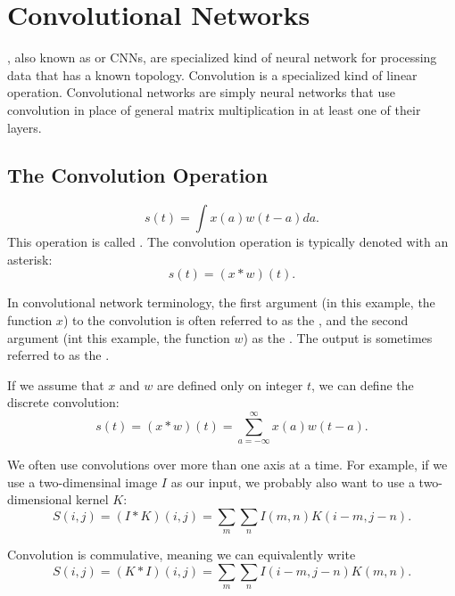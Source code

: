 
\chapter{Convolutional Networks}

, also known as  or CNNs, are specialized kind of neural network for processing data that has a known  topology.
Convolution is a specialized kind of linear operation.
Convolutional networks are simply neural networks that use convolution in place of general matrix multiplication in at least one of their layers.


\section{The Convolution Operation}

\begin{equation}
  \label{eq:convolution}
  s(t) = \int x(a)w(t-a)da.
\end{equation}
This operation is called .
The convolution operation is typically denoted with an asterisk:
\begin{equation}
  s(t) = (x*w)(t).
\end{equation}

In convolutional network terminology, the first argument (in this example, the function $x$) to the convolution is often referred to as the , and the second argument (int this example, the function $w$) as the .
The output is sometimes referred to as the .

If we assume that $x$ and $w$ are defined only on integer $t$, we can define the discrete convolution:
\begin{equation}
  \label{eq:discrete-convolution}
  s(t) = (x*w)(t) = \sum_{a=-\infty}^{\infty} x(a)w(t-a).
\end{equation}


We often use convolutions over more than one axis at a time.
For example, if we use a two-dimensinal image $I$ as our input, we probably also want to use a two-dimensional kernel $K$:
\begin{equation}
  S(i,j) = (I*K)(i,j) = \sum_m\sum_n I(m,n)K(i-m,j-n).
\end{equation}


Convolution is commulative, meaning we can equivalently write
\begin{equation}
  S(i,j) = (K*I)(i,j) = \sum_m\sum_n I(i-m,j-n)K(m,n).
\end{equation}

